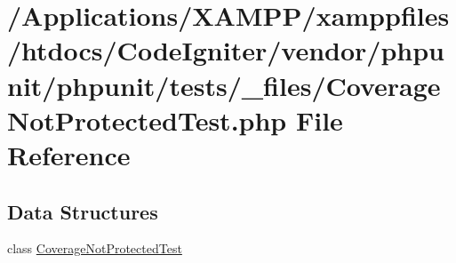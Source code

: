 \hypertarget{phpunit_2tests_2__files_2_coverage_not_protected_test_8php}{}\section{/\+Applications/\+X\+A\+M\+P\+P/xamppfiles/htdocs/\+Code\+Igniter/vendor/phpunit/phpunit/tests/\+\_\+files/\+Coverage\+Not\+Protected\+Test.php File Reference}
\label{phpunit_2tests_2__files_2_coverage_not_protected_test_8php}
\subsection*{Data Structures}
\begin{DoxyCompactItemize}
\item 
class \mbox{\hyperlink{class_coverage_not_protected_test}{Coverage\+Not\+Protected\+Test}}
\end{DoxyCompactItemize}
